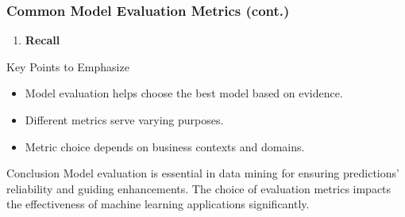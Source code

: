 \documentclass[aspectratio=169]{beamer}
\begin{document}
\begin{frame}[fragile]
    \frametitle{Common Model Evaluation Metrics (cont.)}
    
    \begin{enumerate}[resume]
        \item \textbf{Recall}
    \end{enumerate}

    \begin{block}{Key Points to Emphasize}
        \begin{itemize}
            \item Model evaluation helps choose the best model based on evidence.
            \item Different metrics serve varying purposes.
            \item Metric choice depends on business contexts and domains.
        \end{itemize}
    \end{block}
    
    \begin{block}{Conclusion}
        Model evaluation is essential in data mining for ensuring predictions’ reliability and guiding enhancements. The choice of evaluation metrics impacts the effectiveness of machine learning applications significantly.
    \end{block}
\end{frame}
\end{document}
